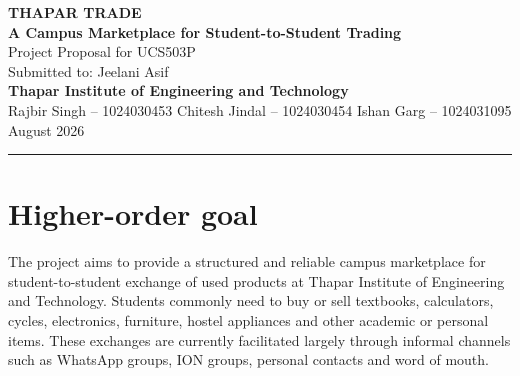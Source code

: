 \documentclass[11pt,a4paper]{article}
\begin{document}

\begin{center}

{\LARGE\textbf{THAPAR TRADE}}\\[0.18cm]

{\large
\textbf{A Campus Marketplace for Student-to-Student Trading}
}\\[0.42cm]

{\normalsize
Project Proposal for UCS503P
}\\[0.10cm]

{\normalsize
Submitted to: Jeelani Asif
}\\[0.10cm]

{\normalsize
\textbf{Thapar Institute of Engineering and Technology}
}\\[0.35cm]

{\normalsize
Rajbir Singh -- 1024030453
\hspace{0.45cm}
Chitesh Jindal -- 1024030454
\hspace{0.45cm}
Ishan Garg -- 1024031095
}\\[0.20cm]
{\normalsize
August 2026
}

\end{center}

\vspace{0.05cm}
\hrule
\vspace{0.12cm}


\section{Higher-order goal}

The project aims to provide a structured and reliable campus
marketplace for student-to-student exchange of used products at
Thapar Institute of Engineering and Technology. Students commonly
need to buy or sell textbooks, calculators, cycles, electronics,
furniture, hostel appliances and other academic or personal items.
These exchanges are currently facilitated largely through informal
channels such as WhatsApp groups, ION groups, personal contacts and
word of mouth.

\end{document}
